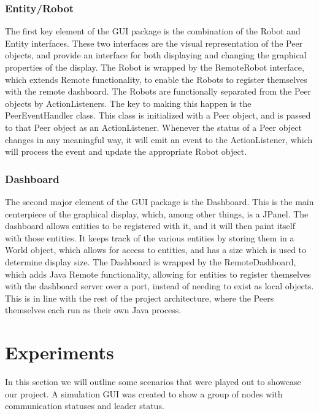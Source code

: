 \documentclass[10pt,letterpaper]{article}
\begin{document}
    \subsubsection{Entity/Robot}
    The first key element of the GUI package is the combination of the Robot and Entity interfaces. These two interfaces are the visual representation of the Peer objects, and provide an interface for both displaying and changing the graphical properties of the display. The Robot is wrapped by the RemoteRobot interface, which extends Remote functionality, to enable the Robots to register themselves with the remote dashboard. The Robots are functionally separated from the Peer objects by ActionListeners. The key to making this happen is the PeerEventHandler class. This class is initialized with a Peer object, and is passed to that Peer object as an ActionListener. Whenever the status of a Peer object changes in any meaningful way, it will emit an event to the ActionListener, which will process the event and update the appropriate Robot object.
    \subsubsection{Dashboard}
    The second major element of the GUI package is the Dashboard. This is the main centerpiece of the graphical display, which, among other things, is a JPanel. The dashboard allows entities to be registered with it, and it will then paint itself with those entities. It keeps track of the various entities by storing them in a World object, which allows for access to entities, and has a size which is used to determine display size. The Dashboard is wrapped by the RemoteDashboard, which adds Java Remote functionality, allowing for entities to register themselves with the dashboard server over a port, instead of needing to exist as local objects. This is in line with the rest of the project architecture, where the Peers themselves each run as their own Java process.

    

\section{Experiments}
In this section we will outline some scenarios that were played out to showcase our project. A simulation GUI was created to show a group of nodes with communication statuses and leader status. 
        
\end{document}

